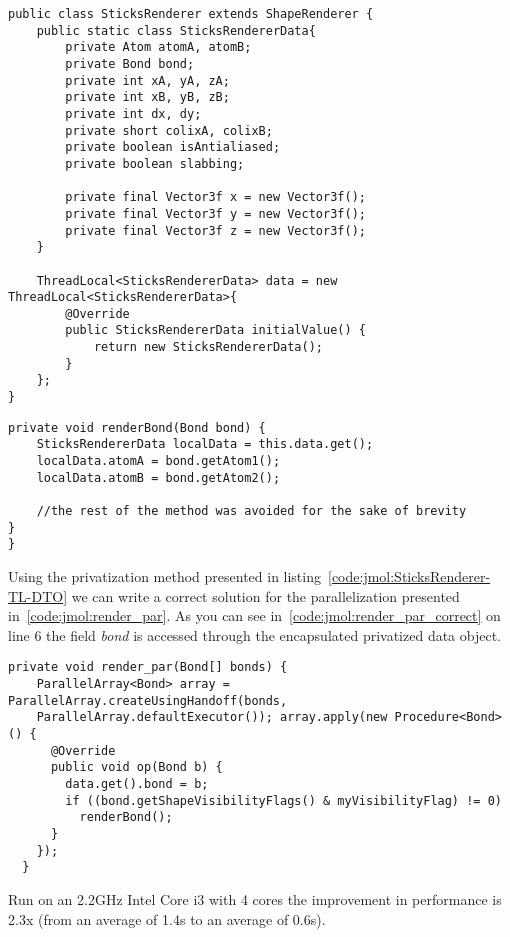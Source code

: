 \begin{lstlisting}[caption={Creating a data transfer object}, label =
{code:jmol:SticksRenderer-TL-DTO}]
public class SticksRenderer extends ShapeRenderer {
	public static class SticksRendererData{
		private Atom atomA, atomB;
  		private Bond bond;
  		private int xA, yA, zA;
  		private int xB, yB, zB;
  		private int dx, dy;
  		private short colixA, colixB;
		private boolean isAntialiased;
  		private boolean slabbing;
  
  		private final Vector3f x = new Vector3f();
  		private final Vector3f y = new Vector3f();
  		private final Vector3f z = new Vector3f();
	}
	
	ThreadLocal<SticksRendererData> data = new ThreadLocal<SticksRendererData>{
		@Override
		public SticksRendererData initialValue() {
			return new SticksRendererData();
		}
	};
}
\end{lstlisting}

\begin{lstlisting}[caption={Referencing a data transfer object}, label =
{code:jmol:DTO-inderection}]
private void renderBond(Bond bond) {
	SticksRendererData localData = this.data.get();
	localData.atomA = bond.getAtom1();
	localData.atomB = bond.getAtom2();
	
	//the rest of the method was avoided for the sake of brevity
}
}
\end{lstlisting}
Using the privatization method presented in
listing~\ref{code:jmol:SticksRenderer-TL-DTO} we can write a correct solution
for the parallelization presented in~\ref{code:jmol:render_par}. As you can see
in~\ref{code:jmol:render_par_correct} on line 6 the field \emph{bond} is
accessed through the encapsulated privatized data object.

\begin{lstlisting}[caption={The correct parallelized version of
listing~\ref{code:jmol:render_seq}}, label = {code:jmol:render_par_correct}]
 private void render_par(Bond[] bonds) {
    ParallelArray<Bond> array = ParallelArray.createUsingHandoff(bonds,
    ParallelArray.defaultExecutor()); array.apply(new Procedure<Bond>() {
      @Override
      public void op(Bond b) {
        data.get().bond = b;
        if ((bond.getShapeVisibilityFlags() & myVisibilityFlag) != 0)
          renderBond();
      }
    });
  }
\end{lstlisting}

Run on an 2.2GHz Intel Core i3 with 4 cores the improvement in performance is
2.3x (from an average of 1.4s to an average of 0.6s).
